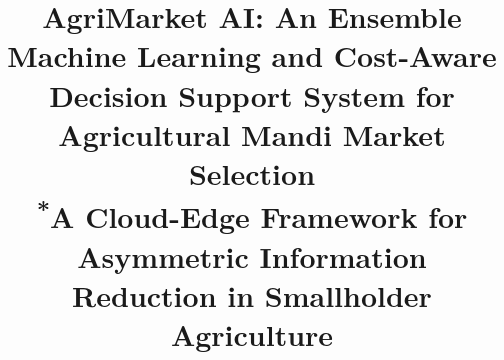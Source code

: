 \documentclass[conference]{IEEEtran}
\begin{document}
\title{AgriMarket AI: An Ensemble Machine Learning and Cost-Aware Decision Support System for Agricultural Mandi Market Selection\\
{\footnotesize \textsuperscript{*}A Cloud-Edge Framework for Asymmetric Information Reduction in Smallholder Agriculture}
}

\author{
}

\maketitle
\end{document}
